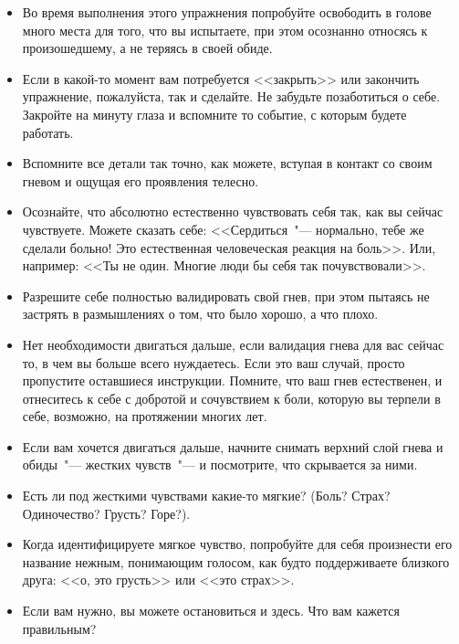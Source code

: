 \begin{itemize}
	\item Во время выполнения этого упражнения попробуйте освободить в голове много места для того, что вы испытаете, при этом осознанно относясь к произошедшему, а не теряясь в своей обиде.
	
	\item Если в какой-то момент вам потребуется <<закрыть>> или закончить упражнение, пожалуйста, так и сделайте. Не забудьте позаботиться о себе. Закройте на минуту глаза и вспомните то событие, с которым будете работать.
	
	\item Вспомните все детали так точно, как можете, вступая в контакт со своим гневом и ощущая его проявления телесно.
	
	\item Осознайте, что абсолютно естественно чувствовать себя так, как вы сейчас чувствуете. Можете сказать себе: <<Сердиться~"--- нормально, тебе же сделали больно! Это естественная человеческая реакция на боль>>. Или, например: <<Ты не один. Многие люди бы себя так почувствовали>>.
	
	\item Разрешите себе полностью валидировать свой гнев, при этом пытаясь не застрять в размышлениях о том, что было хорошо, а что плохо.
	
	\item Нет необходимости двигаться дальше, если валидация гнева для вас сейчас то, в чем вы больше всего нуждаетесь. Если это ваш случай, просто пропустите оставшиеся инструкции. Помните, что ваш гнев естественен, и отнеситесь к себе с добротой и сочувствием к боли, которую вы терпели в себе, возможно, на протяжении многих лет.
\end{itemize}
 
\vspace{3ex}
 

\vspace{1ex}

\begin{itemize}
	\item Если вам хочется двигаться дальше, начните снимать верхний слой гнева и обиды~"--- жестких чувств~"--- и посмотрите, что скрывается за ними.
	
	\item Есть ли под жесткими чувствами какие-то мягкие? (Боль? Страх? Одиночество? Грусть? Горе?).
	
	\item Когда идентифицируете мягкое чувство, попробуйте для себя произнести его название нежным, понимающим голосом, как будто поддерживаете близкого друга: <<о, это грусть>> или <<это страх>>.
	
	\item Если вам нужно, вы можете остановиться и здесь. Что вам кажется правильным?
\end{itemize}

